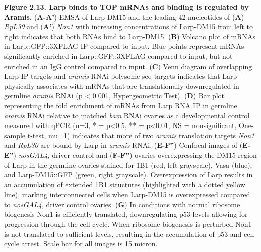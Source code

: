 \documentclass[12pt,oneside]{reedthesis}
\begin{document}
\textbf{\hfill\break
}

\textbf{Figure 2.13. Larp binds to TOP mRNAs and binding is regulated by
Aramis.} (\textbf{A-A'}) EMSA of Larp-DM15 and the leading 42 nucleotides of
(\textbf{A}) \emph{RpL30} and (\textbf{A'}) \emph{Non1} with increasing concentrations of
Larp-DM15 from left to right indicates that both RNAs bind to Larp-DM15.
(\textbf{B}) Volcano plot of mRNAs in Larp::GFP::3XFLAG IP compared to input.
Blue points represent mRNAs significantly enriched in Larp::GFP::3XFLAG
compared to input, but not enriched in an IgG control compared to input.
(\textbf{C}) Venn diagram of overlapping Larp IP targets and \emph{aramis} RNAi
polysome seq targets indicates that Larp physically associates with
mRNAs that are translationally downregulated in germline \emph{aramis} RNAi
(p \textless{} 0.001, Hypergeometric Test). (\textbf{D}) Bar plot representing the
fold enrichment of mRNAs from Larp RNA IP in germline \emph{aramis} RNAi
relative to matched \emph{bam} RNAi ovaries as a developmental control
measured with qPCR (n=3, * = p\textless0.5, ** = p\textless0.01, NS =
nonsignificant, One-sample t-test, mu=1) indicates that more of two
\emph{aramis} translation targets \emph{Non1} and \emph{RpL30} are bound by Larp in
\emph{aramis} RNAi. (\textbf{E-F''}) Confocal images of (\textbf{E-E''}) \emph{nosGAL4},
driver control and (\textbf{F-F''}) ovaries overexpressing the DM15 region of
Larp in the germline ovaries stained for 1B1 (red, left grayscale), Vasa
(blue), and Larp-DM15::GFP (green, right grayscale). Overexpression of
Larp results in an accumulation of extended 1B1 structures (highlighted
with a dotted yellow line), marking interconnected cells when Larp-DM15
is overexpressed compared to \emph{nosGAL4}, driver control ovaries. (\textbf{G})
In conditions with normal ribosome biogenesis Non1 is efficiently
translated, downregulating p53 levels allowing for progression through
the cell cycle. When ribosome biogenesis is perturbed Non1 is not
translated to sufficient levels, resulting in the accumulation of p53
and cell cycle arrest. Scale bar for all images is 15 micron.

\textbf{\hfill\break
}
\end{document}
